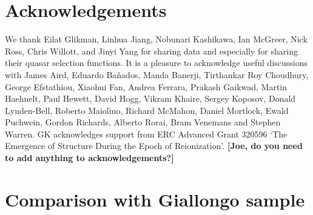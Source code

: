 \documentclass[a4paper,fleqn,usenatbib]{mnras}
\newcommand{\gk}[1]{{\bf \color{notecolor} [#1]}}
\begin{document}
\section*{Acknowledgements}

We thank Eilat Glikman, Linhua Jiang, Nobunari Kashi\-kawa, Ian
McGreer, Nick Ross, Chris Willott, and Jinyi Yang for sharing data and
especially for sharing their quasar selection functions.  It is a
pleasure to acknowledge useful discussions with James Aird, Eduardo
Ba\~nados, Manda Banerji, Tirthankar Roy Choudhury, George Efstathiou,
Xiaohui Fan, Andrea Ferrara, Prakash Gaikwad, Martin Haehnelt, Paul
Hewett, David Hogg, Vikram Khaire, Sergey Koposov, Donald Lynden-Bell,
Roberto Maiolino, Richard McMahon, Daniel Mortlock, Ewald Puchwein,
Gordon Richards, Alberto Rorai, Bram Venemans and Stephen Warren.  GK
acknowledges support from ERC Advanced Grant 320596 `The Emergence of
Structure During the Epoch of Reionization'. \gk{Joe, do you need to
  add anything to acknowledgements?}

\appendix

\section{Comparison with Giallongo sample}
\label{sec:conv}
\end{document}

